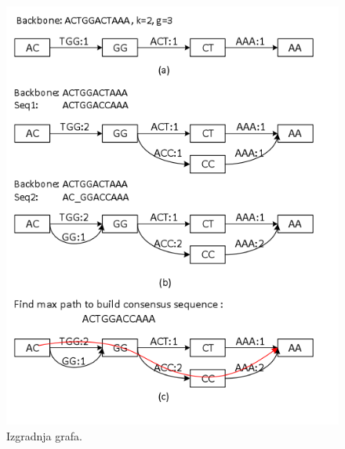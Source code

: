 \begin{figure}[htb]
\centering
\includegraphics[scale=0.6]{figures/sparc.png}
\caption{Izgradnja grafa.}
\label{fig:sparc}
\end{figure}

